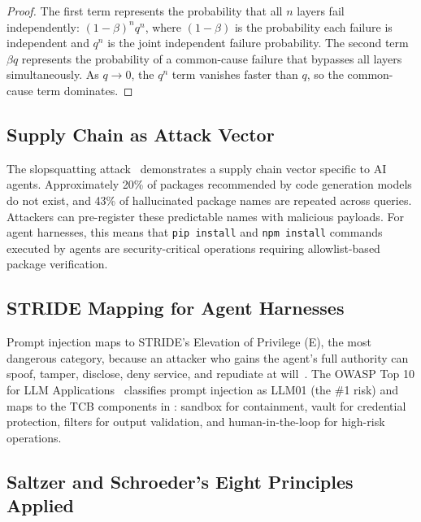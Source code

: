 \documentclass[11pt, a4paper, copyright]{googledeepmind}
\begin{document}
\begin{appendices}
\begin{proof}
The first term represents the probability that all $n$ layers fail independently: $(1-\beta)^n q^n$, where $(1-\beta)$ is the probability each failure is independent and $q^n$ is the joint independent failure probability. The second term $\beta q$ represents the probability of a common-cause failure that bypasses all layers simultaneously. As $q \to 0$, the $q^n$ term vanishes faster than $q$, so the common-cause term dominates.
\end{proof}

\subsection{Supply Chain as Attack Vector}

The slopsquatting attack~\citep{lanyado2025slopsquatting} demonstrates a supply chain vector specific to AI agents. Approximately 20\% of packages recommended by code generation models do not exist, and 43\% of hallucinated package names are repeated across queries. Attackers can pre-register these predictable names with malicious payloads. For agent harnesses, this means that \texttt{pip install} and \texttt{npm install} commands executed by agents are security-critical operations requiring allowlist-based package verification.

\subsection{STRIDE Mapping for Agent Harnesses}

Prompt injection maps to STRIDE's Elevation of Privilege (E), the most dangerous category, because an attacker who gains the agent's full authority can spoof, tamper, disclose, deny service, and repudiate at will~\citep{shostack2014threat}. The OWASP Top 10 for LLM Applications~\citep{owasp2025llm} classifies prompt injection as LLM01 (the \#1 risk) and maps to the TCB components in : sandbox for containment, vault for credential protection, filters for output validation, and human-in-the-loop for high-risk operations.

\subsection{Saltzer and Schroeder's Eight Principles Applied}


\end{appendices}
\end{document}

